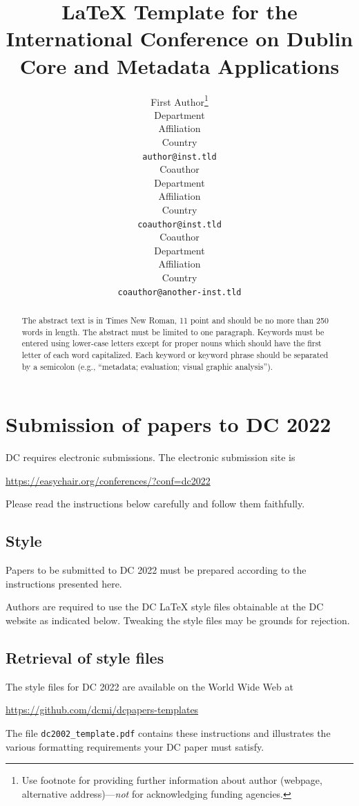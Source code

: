 \documentclass[11pt,a4paper]{article}
\title{\LaTeX{} Template for the International Conference on Dublin Core and Metadata Applications}
\author{%
  First Author\thanks{Use footnote for providing further information
    about author (webpage, alternative address)---\emph{not} for acknowledging
    funding agencies.} \\
  Department \\
  Affiliation\\
  Country \\
  \texttt{author@inst.tld} \\
  \And
  Coauthor \\
  Department \\
  Affiliation \\
  Country \\
  \texttt{coauthor@inst.tld} \\
  \And
  Coauthor \\
  Department \\
  Affiliation \\
  Country \\
  \texttt{coauthor@another-inst.tld} \\
}
\begin{document}
\maketitle

\begin{abstract}
  The abstract text is in Times New Roman, 11 point and should be no more than 250 words in length. The abstract must be limited to one paragraph. Keywords must be entered using lower-case letters except for proper nouns which should have the first letter of each word capitalized.  Each keyword or keyword phrase should be separated by a semicolon (e.g., “metadata; evaluation; visual graphic analysis”).  
\end{abstract}



\section{Submission of papers to DC 2022}

DC requires electronic submissions.  The electronic submission site is
\begin{center}
  \url{https://easychair.org/conferences/?conf=dc2022}
\end{center}

Please read the instructions below carefully and follow them faithfully.

\subsection{Style}

Papers to be submitted to DC 2022 must be prepared according to the
instructions presented here. 

Authors are required to use the DC \LaTeX{} style files obtainable at the
DC website as indicated below. Tweaking the style files may be grounds for
rejection.

\subsection{Retrieval of style files}

The style files for DC 2022 are available on
the World Wide Web at
\begin{center}
  \url{https://github.com/dcmi/dcpapers-templates}
\end{center}
The file \verb+dc2002_template.pdf+ contains these instructions and illustrates the
various formatting requirements your DC paper must satisfy.
\end{document}
